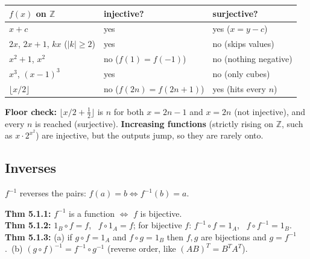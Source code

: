\documentclass{fkt-notes}
\theoremstyle{definition}
\begin{document}
\begin{center}
  \renewcommand{\arraystretch}{1.3}
  \begin{tabular}{@{}lll@{}}
    \toprule
    $f(x)$ on $\mathbb{Z}$         & injective?           & surjective?           \\
    \midrule
    $x+c$                          & yes                  & yes ($x=y-c$)         \\
    $2x$, $2x+1$, $kx$ ($|k|\ge2$) & yes                  & no (skips values)     \\
    $x^2+1$, $x^2$                 & no ($f(1)=f(-1)$)    & no (nothing negative) \\
    $x^3$, $(x-1)^3$               & yes                  & no (only cubes)       \\
    $\lfloor x/2\rfloor$           & no ($f(2n)=f(2n+1)$) & yes (hits every $n$)  \\
    \bottomrule
  \end{tabular}
\end{center}
\textbf{Floor check:} $\lfloor x/2+\tfrac12\rfloor$ is $n$ for both
$x=2n-1$ and $x=2n$ (not injective), and every $n$ is reached
(surjective). \textbf{Increasing functions} (strictly rising on $\mathbb{Z}$,
such as $x\cdot2^{x^2}$) are injective, but the outputs jump, so they are
rarely onto.

\subsection{Inverses}
%
$f^{-1}$ reverses the pairs: $f(a)=b\iff f^{-1}(b)=a$.
\begin{rulebox}
  \textbf{Thm 5.1.1:} $f^{-1}$ is a function $\iff$ $f$ is bijective.\\
  \textbf{Thm 5.1.2:} $1_B\circ f=f$, \ $f\circ1_A=f$; for bijective $f$:
  $f^{-1}\circ f=1_A$, \ $f\circ f^{-1}=1_B$.\\
  \textbf{Thm 5.1.3:} (a) if $g\circ f=1_A$ and $f\circ g=1_B$ then $f,g$
  are bijections and $g=f^{-1}$.\
  (b) $(g\circ f)^{-1}=f^{-1}\circ g^{-1}$ (reverse order, like
  $(AB)^T=B^TA^T$).
\end{rulebox}
\end{document}
